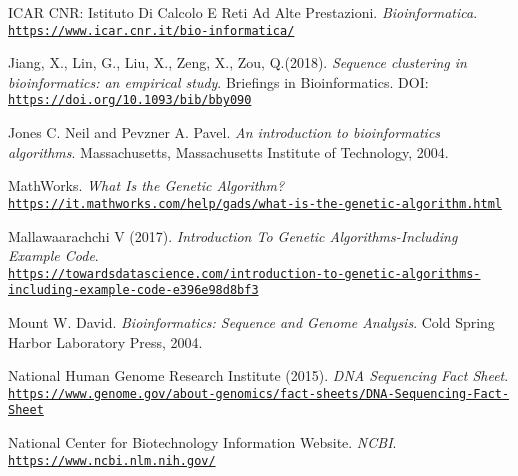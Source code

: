 \documentclass[twoside,openright,titlepage,fleqn,
,	headinclude,12pt,a4paper,BCOR5mm,footinclude,table]{scrbook}
\begin{document}
\begin{thebibliography}{50}
ICAR CNR: Istituto Di Calcolo E Reti Ad Alte Prestazioni.\newline
\textit{Bioinformatica}.
\\\texttt{\url{https://www.icar.cnr.it/bio-informatica/}}

Jiang, X., Lin, G., Liu, X., Zeng, X., Zou, Q.(2018).\newline
\textit{Sequence clustering in bioinformatics: an empirical study}.\newline
Briefings in Bioinformatics.\newline
DOI: \\\texttt{\url{https://doi.org/10.1093/bib/bby090}}

Jones C. Neil and Pevzner A. Pavel.\newline
\textit{An introduction to bioinformatics algorithms}.\newline
Massachusetts, Massachusetts Institute of Technology, 2004.

MathWorks.\newline
\textit{What Is the Genetic Algorithm?}
\\\texttt{\url{https://it.mathworks.com/help/gads/what-is-the-genetic-algorithm.html}}

Mallawaarachchi V (2017).\newline
\textit{Introduction To Genetic Algorithms-Including Example Code}.
\\\texttt{\url{https://towardsdatascience.com/introduction-to-genetic-algorithms-including-example-code-e396e98d8bf3}}

Mount W. David.\newline
\textit{Bioinformatics: Sequence and Genome Analysis}.\newline
Cold Spring Harbor Laboratory Press, 2004.

National Human Genome Research Institute (2015).\newline
\textit{DNA Sequencing Fact Sheet}.
\\\texttt{\url{https://www.genome.gov/about-genomics/fact-sheets/DNA-Sequencing-Fact-Sheet}}

National Center for Biotechnology Information Website.\newline
\textit{NCBI}.
\\\texttt{\url{https://www.ncbi.nlm.nih.gov/}}


\end{thebibliography}
\end{document}
